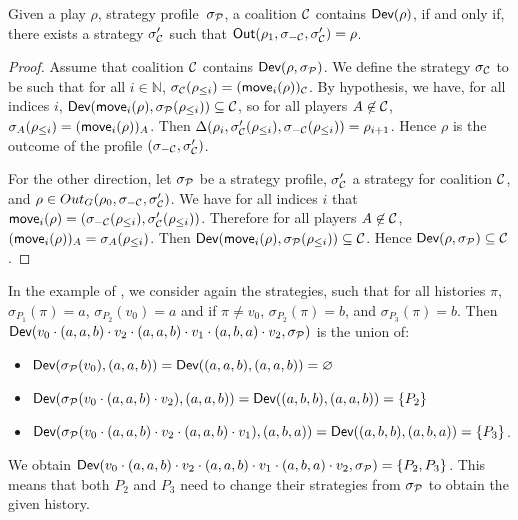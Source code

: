\begin{lemma}\label{14-lem:deviator}
Given a play \(\rho\), strategy profile~$\sigma_{\mathcal{P}}$, a coalition \(\mathcal{C}\)
contains \(\textsf{Dev}(\rho)\), if and only if, there exists a strategy
\(\sigma'_{\mathcal{C}}\) such that \(\textsf{Out}(\rho_1, \sigma_{-\mathcal{C}}, \sigma'_{\mathcal{C}}) = \rho\).
\end{lemma}
\begin{proof}
Assume that coalition \(\mathcal{C}\) contains
\(\textsf{Dev}(\rho, \sigma_{\mathcal{P}})\). We define the strategy \(\sigma_{\mathcal{C}}\) to be
such that for all \(i\in \mathbb{N}\),
\(\sigma_{\mathcal{C}}(\rho_{\le i} ) = (\textsf{move}_i(\rho))_{\mathcal{C}}\). By hypothesis, we have,
for all indices \(i\),
\(\textsf{Dev}(\textsf{move}_i(\rho), \sigma_{\mathcal{P}}(\rho_{\leq i})) \subseteq \mathcal{C}\), so for
all players \(A\not\in \mathcal{C}\),
\(\sigma_A(\rho_{\le i}) = (\textsf{move}_i(\rho))_A\). Then
\(\Delta(\rho_i, \sigma'_{\mathcal{C}}(\rho_{\le i}), \sigma_{-\mathcal{C}}(\rho_{\le i})) = \rho_{i+1}\).
Hence \(\rho\) is the outcome of the profile
\((\sigma_{-\mathcal{C}}, \sigma'_{\mathcal{C}})\).

For the other direction, let \(\sigma_{\mathcal{P}}\) be a strategy profile,
\(\sigma'_{\mathcal{C}}\) a strategy for coalition \(\mathcal{C}\), and
\(\rho \in Out_G(\rho_0 , \sigma_{-\mathcal{C}}, \sigma'_{\mathcal{C}})\). We have for all
indices \(i\) that
\(\textsf{move}_i(\rho) = (\sigma_{-\mathcal{C}}(\rho_{\le i}), \sigma'_{\mathcal{C}}(\rho_{\le i}))\).
Therefore for all players \(A \not\in \mathcal{C}\),
\((\textsf{move}_i(\rho))_A = \sigma_A(\rho_{\le i})\). Then
\(\textsf{Dev}(\textsf{move}_i(\rho), \sigma_{\mathcal{P}}(\rho_{\le i})) \subseteq \mathcal{C}\). Hence
\(\textsf{Dev}(\rho, \sigma_{\mathcal{P}}) \subseteq \mathcal{C}\).
\end{proof}

\begin{example}
  In the example of , we consider again the strategies,
  such that for all histories $\pi$, $\sigma_{P_1}(\pi) = a$,
  $\sigma_{P_2}(v_0) = a$ and if $\pi \ne v_0$, $\sigma_{P_2}(\pi) = b$,
  and $\sigma_{P_3}(\pi) = b$.
  Then $\textsf{Dev}(v_0 \cdot (a, a, b) \cdot v_2 \cdot (a, a, b) \cdot v_1 \cdot
  (a, b, a) \cdot v_2, \sigma_{\mathcal{P}})$ is the union of:
  \begin{itemize}
  \item $\textsf{Dev}(\sigma_{\mathcal{P}}(v_0), (a, a, b)) = \textsf{Dev}((a, a, b), (a, a, b)) = \varnothing$
  \item $\textsf{Dev}(\sigma_{\mathcal{P}}(v_0 \cdot (a, a, b) \cdot v_2), (a, a, b)) =
    \textsf{Dev}( (a, b, b), (a, a, b)) = \{P_2\}$
  \item $\textsf{Dev}(\sigma_{\mathcal{P}}(v_0 \cdot (a, a, b) \cdot v_2 \cdot (a, a, b) \cdot v_1), (a, b, a)) =
    \textsf{Dev}( (a, b, b), (a, b, a)) = \{P_3\}$.
  \end{itemize}
  We obtain
  $\textsf{Dev}(v_0 \cdot (a, a, b) \cdot v_2 \cdot (a, a, b) \cdot v_1 \cdot
  (a, b, a) \cdot v_2, \sigma_{\mathcal{P}}) = \{ P_2, P_3\}$.
  This means that both $P_2$ and $P_3$ need to change their strategies
  from $\sigma_{\mathcal{P}}$ to obtain the given history.
\end{example}

